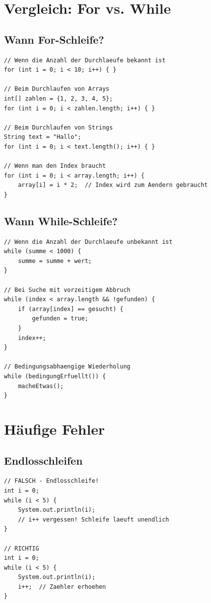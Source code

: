 \section*{Vergleich: For vs. While}

\subsection*{Wann For-Schleife?}
\begin{lstlisting}
// Wenn die Anzahl der Durchlaeufe bekannt ist
for (int i = 0; i < 10; i++) { }

// Beim Durchlaufen von Arrays
int[] zahlen = {1, 2, 3, 4, 5};
for (int i = 0; i < zahlen.length; i++) { }

// Beim Durchlaufen von Strings
String text = "Hallo";
for (int i = 0; i < text.length(); i++) { }

// Wenn man den Index braucht
for (int i = 0; i < array.length; i++) {
    array[i] = i * 2;  // Index wird zum Aendern gebraucht
}
\end{lstlisting}

\subsection*{Wann While-Schleife?}
\begin{lstlisting}
// Wenn die Anzahl der Durchlaeufe unbekannt ist
while (summe < 1000) {
    summe = summe + wert;
}

// Bei Suche mit vorzeitigem Abbruch
while (index < array.length && !gefunden) {
    if (array[index] == gesucht) {
        gefunden = true;
    }
    index++;
}

// Bedingungsabhaengige Wiederholung
while (bedingungErfuellt()) {
    macheEtwas();
}
\end{lstlisting}

\newpage


\section*{Häufige Fehler}

\subsection*{Endlosschleifen}

\begin{lstlisting}
// FALSCH - Endlosschleife!
int i = 0;
while (i < 5) {
    System.out.println(i);
    // i++ vergessen! Schleife laeuft unendlich
}

// RICHTIG
int i = 0;
while (i < 5) {
    System.out.println(i);
    i++;  // Zaehler erhoehen
}
\end{lstlisting}


